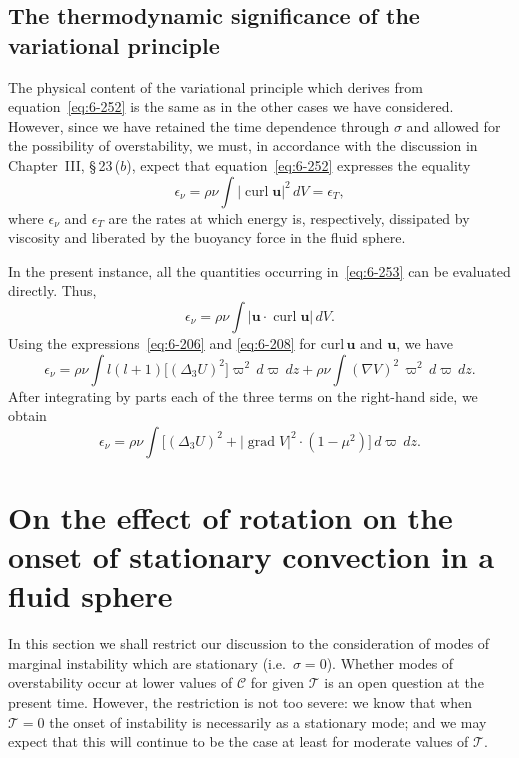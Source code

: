 \subsection{The thermodynamic significance of the variational principle}\label{sec:61e}
The physical content of the variational principle which derives from
equation~\eqref{eq:6-252} is the same as in the other cases we have considered.
However, since we have retained the time dependence through $\sigma$ and
allowed for the possibility of overstability, we must, in accordance with
the discussion in Chapter~III, \S\,23\,($b$), expect that equation~\eqref{eq:6-252}
expresses the equality
\begin{equation}\label{eq:6-253}
\epsilon_\nu = \rho\nu\!\int |\operatorname{curl}\boldsymbol{u}|^2\,dV = \epsilon_T,
\end{equation}
where $\epsilon_\nu$ and $\epsilon_T$ are the rates at which energy is, respectively, dissipated
by viscosity and liberated by the buoyancy force in the fluid sphere.

In the present instance, all the quantities occurring in~\eqref{eq:6-253} can be
evaluated directly. Thus,
\begin{equation}\label{eq:6-254}
\epsilon_\nu = \rho\nu\!\int |\boldsymbol{u}\cdot\operatorname{curl}\boldsymbol{u}|\,dV.
\end{equation}
Using the expressions~\eqref{eq:6-206} and \eqref{eq:6-208} for curl$\,\boldsymbol{u}$ and $\boldsymbol{u}$, we have
\begin{equation}\label{eq:6-255}
\epsilon_\nu = \rho\nu\int l(l+1)\bigl[(\Delta_3 U)^2\bigl]\varpi^2\,d\varpi\,dz + \rho\nu\int(\nabla V)^2\,\varpi^2\,d\varpi\,dz.
\end{equation}
After integrating by parts each of the three terms on the right-hand side,
we obtain
\begin{equation}\label{eq:6-256}
\epsilon_\nu = \rho\nu\!\int\bigl[(\Delta_3 U)^2 + |\operatorname{grad} V|^2\cdot(1-\mu^2)\bigr]\,d\varpi\,dz.
\end{equation}

\section{On the effect of rotation on the onset of stationary convection in a fluid sphere}\label{sec:62}
In this section we shall restrict our discussion to the consideration
of modes of marginal instability which are stationary (i.e.\ $\sigma = 0$).
Whether modes of overstability occur at lower values of $\mathcal{C}$ for given
$\mathscr{T}$ is an open question at the present time. However, the restriction
is not too severe: we know that when $\mathscr{T} = 0$ the onset of instability
is necessarily as a stationary mode; and we may expect that this will
continue to be the case at least for moderate values of $\mathscr{T}$.

